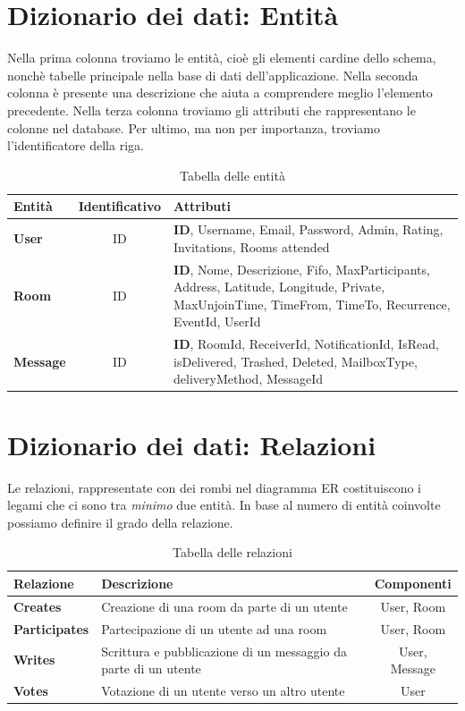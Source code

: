 \section{Dizionario dei dati: Entità}
Nella prima colonna troviamo le entità, cioè gli elementi cardine dello schema, nonchè tabelle principale nella base di dati dell'applicazione. Nella seconda colonna è presente una descrizione che aiuta a comprendere meglio l'elemento precedente. Nella terza colonna troviamo gli attributi che rappresentano le colonne nel database. Per ultimo, ma non per importanza, troviamo l'identificatore della riga.\newline

\begin{table}[H]
	\centering
	\caption{Tabella delle entità}
	\begin{tabularx}{\textwidth}{l c X}
		\toprule
		Entità & Identificativo & Attributi\\
		\midrule
		\textbf{User} & ID & \textbf{ID}, Username, Email, Password, Admin, Rating, Invitations, Rooms attended \\
		\textbf{Room} & ID & \textbf{ID}, Nome, Descrizione, Fifo, MaxParticipants, Address, Latitude, Longitude, Private, MaxUnjoinTime, TimeFrom, TimeTo, Recurrence, EventId, UserId \\
		\textbf{Message} & ID & \textbf{ID}, RoomId, ReceiverId, NotificationId, IsRead, isDelivered, Trashed, Deleted, MailboxType, deliveryMethod, MessageId \\
		\bottomrule
	\end{tabularx}
\end{table}

\section{Dizionario dei dati: Relazioni}
Le relazioni, rappresentate con dei rombi nel diagramma ER costituiscono i legami che ci sono tra \textit{minimo} due entità. In base al numero di entità coinvolte possiamo definire il grado della relazione.
\begin{table}[H]
	\centering
	\caption{Tabella delle relazioni}
	\begin{tabularx}{\textwidth}{l X c}
		\toprule
		Relazione & Descrizione & Componenti\\
		\midrule
		\textbf{Creates} & Creazione di una room da parte di un utente & User, Room \\
		\textbf{Participates} & Partecipazione di un utente ad una room & User, Room \\
		\textbf{Writes} & Scrittura e pubblicazione di un messaggio da parte di un utente & User, Message\\
		\textbf{Votes} & Votazione di un utente verso un altro utente & User \\
		\bottomrule
	\end{tabularx}
\end{table}


